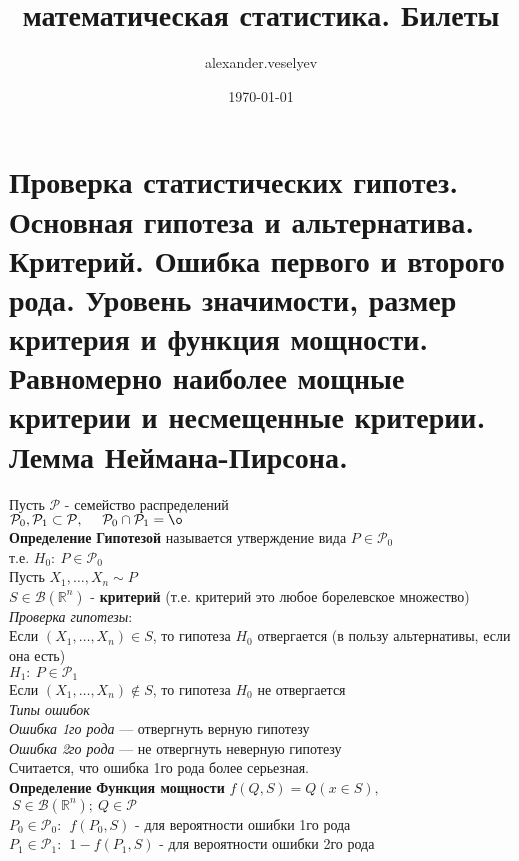 \documentclass{article}
\title{математическая статистика. Билеты}
\author{alexander.veselyev }
\date{\today}
\begin{document}
\section{Проверка статистических гипотез. Основная гипотеза и альтернатива. Критерий. Ошибка первого и второго рода. Уровень значимости, размер критерия и функция мощности. Равномерно наиболее мощные критерии и несмещенные критерии. Лемма Неймана-Пирсона.}

Пусть $\mathcal{P}$ - семейство распределений\\
$\mathcal{P}_0, \mathcal{P}_1 \subset \mathcal{P},\ \ \ \ \mathcal{P}_0\cap\mathcal{P}_1 = \o$\\

\textbf{Определение} \textbf{Гипотезой} называется утверждение вида $P\in\mathcal{P}_0$\\
т.е. $H_0:\ P\in\mathcal{P}_0$\\ 

Пусть $X_1,\dots,X_n\sim P$\\

$S\in\mathcal{B}(\mathbb{R}^n)$ - \textbf{критерий} (т.е. критерий это любое борелевское множество)\\

\textit{Проверка гипотезы}:\\
Если $(X_1,\dots,X_n)\in S$, то гипотеза $H_0$ отвергается (в пользу альтернативы, если она есть)\\
$H_1:\ P\in\mathcal{P}_1$\\

Если $(X_1,\dots,X_n)\notin S$, то гипотеза $H_0$ не отвергается\\

\textit{Типы ошибок}\\
\textit{Ошибка 1го рода} --- отвергнуть верную гипотезу\\
\textit{Ошибка 2го рода} --- не отвергнуть неверную гипотезу\\

Считается, что ошибка 1го рода более серьезная.\\

\textbf{Определение} \textbf{Функция мощности} $f(Q, S) = Q(x\in S),$\\  $\  S\in\mathcal{B}(\mathbb{R}^n);\ Q\in\mathcal{P}$\\
$P_0 \in\mathcal{P}_0:\ \ f(P_0,S)$ - для вероятности ошибки 1го рода\\
$P_1\in\mathcal{P}_1:\ \ 1 - f(P_1, S)$ - для вероятности ошибки 2го рода\\
\end{document}
